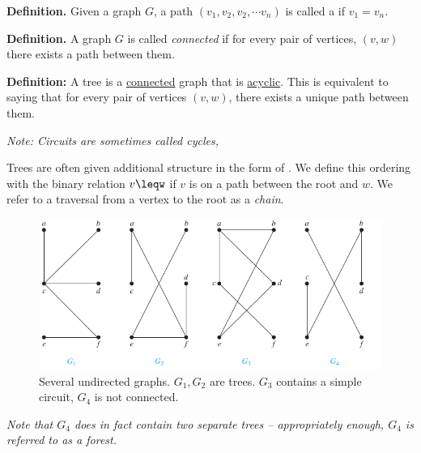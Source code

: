\documentclass[a4paper,10pt]{report}
\begin{document}
\textbf{Definition.} Given a graph $G$, a path $(v_1, v_2, v_2, \cdots v_n)$ is called a  if $v_1 = v_n$.

\textbf{Definition.} A graph $G$ is called \textit{connected} if for every pair of vertices, $(v,w)$ there exists a path between them.

\noindent\textbf{Definition:}  A tree is a \underline{connected} graph that is \underline{acyclic}. This is equivalent to saying that for every pair of vertices $(v,w)$, there exists a unique path between them.

\textit{Note: Circuits are sometimes called cycles,}

Trees are often given additional structure in the form of . We define this ordering with the binary relation $v\leqw$ if $v$ is on a path between the root and $w$. We refer to a traversal from a vertex to the root as a \textit{chain}.

\begin{figure}[h!]
	\begin{centering}
	\begin{center}
	\includegraphics[width=\linewidth]{./some_trees.png}
	\caption{Several undirected graphs. $G_1, G_2$ are trees. $G_3$ contains a simple circuit, $G_4$ is not connected.}
	\label{fig:some_trees}
	\end{center}
	\par\end{centering}
\end{figure}

\textit{Note that $G_4$ does in fact contain two separate trees -- appropriately enough, $G_4$ is referred to as a forest.} \\ \\
\end{document}
